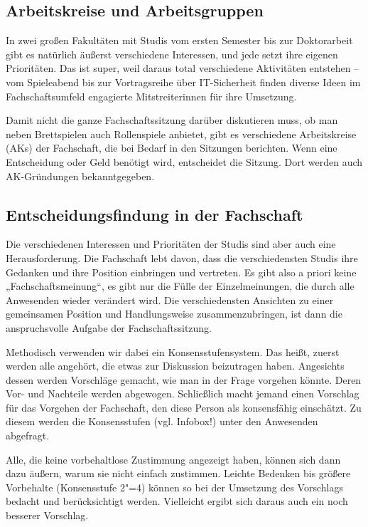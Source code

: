 
\subsection{Arbeitskreise und Arbeitsgruppen}
In zwei großen Fakultäten mit Studis vom ersten Semester bis zur Doktorarbeit gibt es natürlich äußerst verschiedene Interessen, und jede setzt ihre eigenen Prioritäten. Das ist super, weil daraus total verschiedene Aktivitäten entstehen -- vom Spieleabend bis zur Vortragsreihe über IT-Sicherheit finden diverse Ideen im Fachschaftsumfeld engagierte Mitstreiterinnen für ihre Umsetzung.

Damit nicht die ganze Fachschaftssitzung darüber diskutieren muss, ob man neben Brettspielen auch Rollenspiele anbietet, gibt es verschiedene Arbeitskreise (AKs) der Fachschaft, die bei Bedarf in den Sitzungen berichten. Wenn eine Entscheidung oder Geld benötigt wird, entscheidet die Sitzung. Dort werden auch AK-Gründungen bekanntgegeben.

\subsection{Entscheidungsfindung in der Fachschaft}


Die verschiedenen Interessen und Prioritäten der Studis sind aber auch eine Herausforderung. Die Fachschaft lebt davon, dass die verschiedensten Studis ihre Gedanken und ihre Position einbringen und vertreten. Es gibt also a priori keine „Fachschaftsmeinung“, es gibt nur die Fülle der Einzelmeinungen, die durch alle Anwesenden wieder verändert wird. Die verschiedensten Ansichten zu einer gemeinsamen Position und Handlungsweise zusammenzubringen, ist dann die anspruchsvolle Aufgabe der Fachschaftssitzung.

Methodisch verwenden wir dabei ein Konsensstufensystem. Das heißt, zuerst werden alle angehört, die etwas zur Diskussion beizutragen haben. Angesichts dessen werden Vorschläge gemacht, wie man in der Frage vorgehen könnte. Deren Vor- und Nachteile werden abgewogen. Schließlich macht jemand einen Vorschlag für das Vorgehen der Fachschaft, den diese Person als konsensfähig einschätzt. Zu diesem werden die Konsensstufen (vgl. Infobox!) unter den Anwesenden abgefragt.

Alle, die keine vorbehaltlose Zustimmung angezeigt haben, können sich dann dazu äußern, warum sie nicht einfach zustimmen. Leichte Bedenken bis größere Vorbehalte (Konsensstufe 2"=4) können so bei der Umsetzung des Vorschlags bedacht und berücksichtigt werden. Vielleicht ergibt sich daraus auch ein noch besserer Vorschlag.


